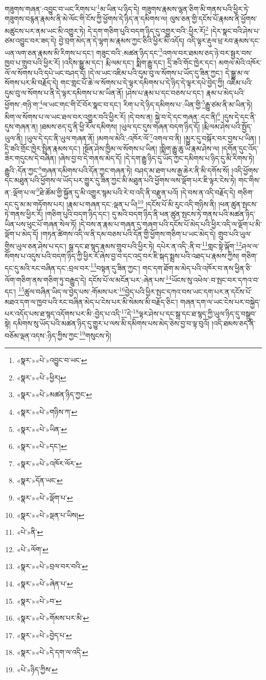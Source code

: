 གཟུགས་གཞན་:འབྱུང་བ་ཡང་རིགས་པ་\footnote{«སྣར་»«པེ་»འབྱུང་བ་ཡང་}མ་ཡིན་པ་ཉིད་དེ། གཟུགས་རྣམས་ལྷན་ཅིག་མི་གནས་པའི་ཕྱིར་ཏེ་གཟུགས་བརྙན་རྣམས་ནི་མེ་ལོང་གི་ངོས་ཀྱི་ཕྱོགས་དེ་ཉིད་ན་དམིགས་ལ། ལུས་ཅན་གྱི་དངོས་པོ་རྣམས་ནི་ཕྱོགས་མཚུངས་པར་ནམ་ཡང་མི་འགྱུར་ཏེ། དེ་དག་གཅིག་པུའི་བདག་ཉིད་དུ་འགྱུར་བའི་:ཕྱིར་རོ།\footnote{«སྣར་»«པེ་»ཕྱིར།} །དེར་སྣང་བའི་ཤེས་པ་ཙམ་འབྱུང་བར་ཟད་དེ། བྱེ་བྲག་མེད་ན་དེ་ལྷག་མ་རྣམས་ཀྱང་ཅིའི་ཕྱིར་མི་འདོད། འདི་ལྟར་རྡུལ་ཕྲ་རབ་རྣམས་དང་ཡན་ལག་ཅན་རྣམས་མི་རིགས་པ་དང་། གཟུང་བའི་:མཚན་ཉིད་དང་\footnote{«སྣར་»«པེ་»མཚན་ཉིད་ཀྱང་}འགལ་བར་ཐམས་ཅད་ཉེ་བར་སྦྱར་བས་ཁྱབ་པ་གྲུབ་པའི་ཕྱིར་རོ། །འདིས་སྒྱུ་མ་དང་། རྨི་ལམ་དང་། སྨིག་རྒྱུ་དང་། དྲི་ཟའི་གོང་ཁྱེར་དང་། མགལ་མེའི་འཁོར་ལོ་ལ་སོགས་པའི་དཔེ་ཡང་བཤད་དོ། །དེ་ལ་ཡང་འཇིམ་པའི་དུམ་བུ་ལ་སོགས་པ་ཡོད་དུ་ཟིན་ཀྱང་། དེ་སྒྱུ་མ་ལ་སོགས་པར་མི་བརྗོད་དེ། གང་གླང་པོ་ཆེ་ལ་སོགས་པ་དེ་ལྟར་དམིགས་པ་དེ་ཉིད་དེ་ལྟར་དཔེ་བྱེད་ཀྱི། འཇིམ་པའི་དུམ་བུ་ལ་སོགས་པ་ནི་དེ་ལྟར་དམིགས་པ་མ་ཡིན་ནོ། །ཤེས་པ་རྣམ་པ་དང་བཅས་པ་དང་། རྣམ་པ་མེད་པའི་ཕྱོགས་:གཉི་ག་\footnote{«སྣར་»«པེ་»གཉིས་ཀ་}ལ་ཡང་གང་གི་ངོ་བོར་སྣང་བ་དང་། རིག་པ་དེ་ཉིད་དམིགས་པ་:ཡིན་གྱི་\footnote{«སྣར་»«པེ་»ཡིན་}རྒྱུ་ཙམ་ནི་མ་ཡིན་ཏེ། མིག་ལ་སོགས་པ་ལ་ཡང་ཐལ་བར་འགྱུར་བའི་ཕྱིར་རོ། །དེ་བས་ན། སྐྱེ་བ་དེ་དང་གཞན་:དང་ནི།\footnote{«སྣར་»«པེ་»དང་།} །དུས་དེ་དང་ནི་དུས་གཞན་ན། །ཐམས་ཅད་དུ་ནི་ཕྱི་རོལ་དམིགས། །ཡུལ་དང་དུས་གཞན་བདག་ཉིད་དོ། །རྨི་ལམ་ཤེས་པའི་སྤྱོད་ཡུལ་ནི། །ཡུལ་དེ་དང་ནི་ཡུལ་གཞན་ནོ། །མགལ་མེའི་:འཁོར་ལོ་\footnote{«སྣར་»«པེ་»འཁོར་ལོར་}འགལ་བ་ནི། །མྱུར་དུ་བསྐོར་བར་བྱས་པ་ཡིན། །དྲི་ཟའི་གྲོང་ཁྱེར་སྤྲིན་རྣམས་དང་། །སྔོན་ཤེས་ཁྱིམ་ལ་སོགས་པ་ཡིན། །སྨིག་རྒྱུ་ཆུ་ཡི་རྣམ་ཤེས་ལ། །དགོན་དུང་འོད་ཟེར་གདུངས་དེ་བཞིན། །ཞེས་བྱ་བ་དེ་གནས་མེད་དོ། །དེ་དག་རྒྱུ་ཉིད་དུ་ཡོད་ཀྱང་དམིགས་པ་ཉིད་དུ་མི་རིགས་ཏེ། རྒྱུའི་:དོན་ཀྱང་\footnote{«སྣར་»དོན་ཡང་}གཞན་དམིགས་པའི་དོན་ཀྱང་གཞན་ཏེ། བཤད་མ་ཐག་པས་རྒྱ་ཆེར་ནི་མི་དགོས་སོ། །འདི་ཕྱོགས་དང་མཐུན་པའི་ཕྱོགས་ལ་ཡོད་པར་གྱུར་དུ་ཟིན་ཀྱང་མི་མཐུན་པའི་ཕྱོགས་ལས་ལྡོག་པར་ཇི་ལྟར་ངེས་ཏེ། གང་གིས་ན་:ལྡོག་པ་ལ་\footnote{«སྣར་»«པེ་»ལྡོག་པ་}ཐེ་ཚོམ་གྱི་སྐྱོན་དུ་མི་འགྱུར་སྙམ་པའི་རེ་བ་འདི་ནི་བརྫུན་པའོ། །དེ་བས་ན་འདི་བརྗོད་དེ། གཅིག་དང་དུ་མ་མ་གཏོགས་པར། །རྣམ་པ་གཞན་དང་:ལྡན་པ་ཡི།\footnote{«སྣར་»«པེ་»ལྡན་པ་ཡིས།} །དངོས་པོ་མི་རུང་འདི་གཉིས་ནི། །ཕན་ཚུན་སྤངས་ཏེ་གནས་ཕྱིར་རོ། །གཅིག་པུའི་བདག་ཉིད་དང་། དུ་མའི་བདག་ཉིད་ནི་ཕན་ཚུན་སྤངས་ཏེ་གནས་པའི་མཚན་ཉིད་ཡིན་པས་ཕུང་པོ་གཞན་སེལ་ཏོ། །དེ་བས་ན་རྣམ་པ་གཞན་དུ་གཞག་པའི་དངོས་པོ་མེད་པའི་ཕྱིར་འདི་ལ་ལྡོག་པ་མི་ལྡོག་པ་མེད་དོ། །གཏན་ཚིགས་འདི་ལ་ནི་དམ་བཅས་པའི་དོན་གྱི་ཕྱོགས་གཅིག་པ་ཡང་མེད་དེ། གྲུབ་པའི་ཡུལ་གྱིས་ཡུལ་ཅན་ཤེས་པ་དང་། སྒྲ་དང་ཐ་སྙད་རྣམས་གྲུབ་པའི་ཕྱིར་ཏེ། དཔེར་ན་འདི་:ནི་བ་\footnote{«པེ་»ནི་}གླང་སྟེ་ལྐོག་\footnote{«པེ་»ལོག་}ཤལ་ལ་སོགས་པ་འདུས་པའི་བདག་ཉིད་ཀྱི་ཕྱིར་རོ་ཞེས་བྱ་བ་དང་འདྲ་བར་ཇི་སྐད་སྨྲས་པའི་འཐད་པ་རྣམས་ཀྱིས། གཅིག་དང་དུ་མའི་རང་བཞིན་དང་:བྲལ་བར་\footnote{«སྣར་»«པེ་»བྲལ་བར་བའི་}བསྟན་དུ་ཟིན་ཀྱང་། གང་དག་ཐོག་མ་མེད་པའི་འཁོར་བ་ནས་ཕྱིན་ཅི་ལོག་གཅིག་ནས་གཅིག་ཏུ་བརྒྱུད་དེ། དངོས་པོ་ལ་མངོན་པར་:ཞེན་པས་\footnote{«སྣར་»«པེ་»ཞེན་པ་}ཡོངས་སུ་འཕེལ་:བ་སྤང་བར་དཀའ་བ་དང་། \footnote{«སྣར་»«པེ་»བ་}ཚུལ་བཞིན་ཡིད་ལ་བྱེད་པས་:གོམས་པར་\footnote{«སྣར་»«པེ་»གོམས་པར་མི་}བྱེད་པའི་ཕྱིར་སྤང་དཀའ་བས་ཡང་དག་པར་ན་དངོས་པོ་མཐའ་དག་ལ་ཁྱབ་པའི་རང་བཞིན་མེད་པ་ངེས་པར་མི་སེམས་མི་བརྗོད་ཅིང་། གཞན་དག་ལ་ཡང་ངེས་པར་བསྐྱེད་པར་འདོད་པས་ཐ་སྙད་འདོགས་པར་མི་:བྱེད་པ་འདི་\footnote{«སྣར་»«པེ་»བྱེད་པ་}དེ་\footnote{«སྣར་»«པེ་»དེ་དག་ལ་འདི་}ལྟར་ཤེས་པ་དང་སྒྲ་དང་ཐ་སྙད་ཀྱི་ཡུལ་ཉིད་དུ་བསྒྲུབ་སྟེ། དམིགས་སུ་ཡོད་པའི་མཚན་ཉིད་དུ་གྱུར་པ་ལས་མི་དམིགས་པས་མེད་ཅེས་བྱ་བ་ལྟ་བུའོ། །འདི་ཐམས་ཅད་ནི་བཅོམ་ལྡན་འདས་:ཉིད་ཀྱིས་ཀྱང་\footnote{«པེ་»ཉིད་ཀྱིས་}གསུངས་ཏེ། 
